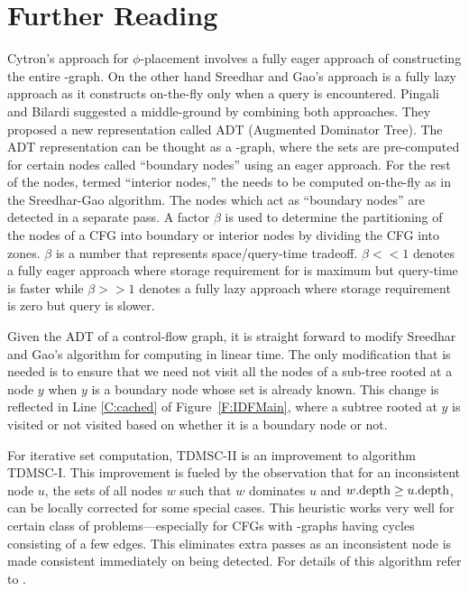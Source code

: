 {\section{Further Reading}

Cytron's approach for $\phi$-placement involves a fully eager approach of constructing the entire \DF-graph. 
On the other hand Sreedhar and Gao's approach is a fully lazy approach as it constructs \DF on-the-fly only when a query is encountered. 
Pingali and Bilardi \cite{bilardi} suggested a middle-ground by combining both approaches. 
They proposed a new representation called ADT (Augmented Dominator Tree). 
The ADT representation can be thought as a \DJ-graph, where the \DF sets are pre-computed for certain nodes called ``boundary nodes'' using an eager approach. 
For the rest of the nodes, termed ``interior nodes,'' the \DF needs to be computed on-the-fly as in the Sreedhar-Gao algorithm. 
The nodes which act as ``boundary nodes'' are detected in a separate pass. 
A factor $\beta$ is used to determine the partitioning of the nodes of a CFG into boundary or interior nodes by dividing the CFG into zones. 
$\beta$ is a number that represents space/query-time tradeoff. 
$\beta <\!\!< 1$ denotes a fully eager approach where storage requirement for \DF is maximum but query-time is faster while $\beta >\!\!> 1$ denotes a fully lazy approach where storage requirement is zero but query is slower.

Given the ADT of a control-flow graph, it is straight forward to modify Sreedhar and Gao's algorithm for computing \phifuns in linear time. 
The only modification that is needed is to ensure that we need not visit all the nodes of a sub-tree rooted at a node $y$ when $y$ is a boundary node whose \DF set is already known. 
This change is reflected in Line \ref{C:cached} of Figure~\ref{F:IDFMain}, where a subtree rooted at $y$ is visited or not visited based on whether it is a boundary node or not.

For iterative \iDF set computation, TDMSC-II is an improvement to algorithm TDMSC-I. 
This improvement is fueled by the observation that for an inconsistent node $u$, the \iDF sets of all nodes $w$ such that $w$ dominates $u$ and $w.\textrm{depth} \geq u.\textrm{depth}$, can be locally corrected for some special cases. 
This heuristic works very well for certain class of problems---especially for CFGs with \DF-graphs having cycles consisting of a few edges. 
This eliminates extra passes as an inconsistent node is made consistent immediately on being detected. 
For details of this algorithm refer to \cite{das}.


}

